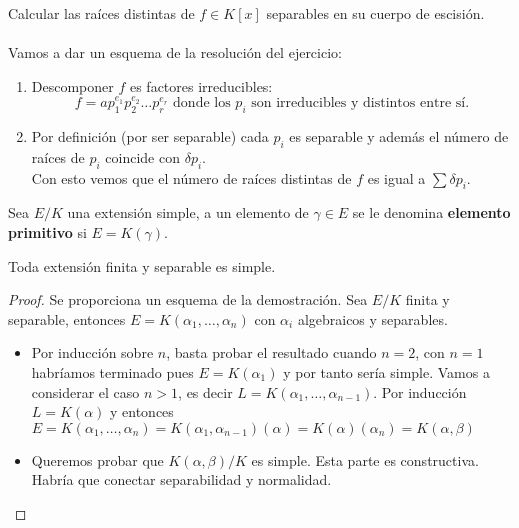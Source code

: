 \begin{ex}[H3.??]
    Calcular las raíces distintas de $f \in K[x]$ separables en su cuerpo de escisión.\\\\
    Vamos a dar un esquema de la resolución del ejercicio:
    \begin{enumerate}
        \item Descomponer $f$ es factores irreducibles:
        $$
            f = a p_1^{e_1} p_2^{e_2} \ldots p_r^{e_r} \text{ donde los $p_i$ son irreducibles y distintos entre sí.}
        $$
        \item Por definición (por ser separable) cada $p_i$ es separable y además el número de raíces de $p_i$ coincide con $\delta p_i$.\\
        Con esto vemos que el número de raíces distintas de $f$ es igual a $\sum \delta p_i$.
    \end{enumerate}
\end{ex}


\begin{dfn}
    Sea $E/K$ una extensión simple, a un elemento de $\gamma \in E$ se le denomina \textbf{elemento primitivo} si $E = K(\gamma)$.
\end{dfn}

\begin{thm}\label{thm:elemprim}
    Toda extensión finita y separable es simple.
\end{thm}

\begin{proof}
    Se proporciona un esquema de la demostración. Sea $E/K$ finita y separable, entonces $E = K(\alpha_1, \ldots, \alpha_n)$ con $\alpha_i$ algebraicos y separables.
    \begin{itemize}
        \item Por inducción sobre $n$, basta probar el resultado cuando $n =2$, con $n = 1$ habríamos terminado pues $E = K(\alpha_1)$ y por tanto sería simple. Vamos a considerar el caso $n > 1$, es decir $L = K(\alpha_1, \ldots, \alpha_{n-1})$. Por inducción $L = K(\alpha)$ y entonces $E = K(\alpha_1, \ldots, \alpha_n) = K(\alpha_1, \alpha_{n-1})(\alpha) = K(\alpha)(\alpha_n) = K(\alpha, \beta)$
        \item Queremos probar que $K(\alpha, \beta)/K$ es simple. Esta parte es constructiva. Habría que conectar separabilidad y normalidad.
    \end{itemize}
\end{proof}


